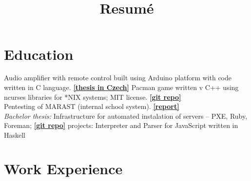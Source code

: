 \documentclass[11pt,a4paper]{moderncv}        %
\title{Resumé}                               %
\begin{document}
  \makecvtitle

  \section{Education}
          {Audio amplifier with remote control built using Arduino platform with code written in C language. \href{https://bitbucket.org/j-sokol/amplifier-thesis/raw/cc8bd90b60f1a370cd586138043608f768a8d719/Dokumentace1.pdf}{\textbf{[thesis in Czech]}} }  %
          {Pacman game written v C++ using ncurses libraries for *NIX systems; MIT license. \href{https://github.com/j-sokol/ncursesPac}{\textbf{[git repo]}} \\
          Pentesting of MARAST (internal school system). \href{https://bitbucket.org/j-sokol/marast-pentest-report/raw/376bb2e8dc154c45286e8a6963c00aa809b3931a/Penetration-Test-Report-on-Marast-Application.pdf}{\textbf{[report]}} \\
          \textit{Bachelor thesis:} Infrastructure for automated instalation of servers -- PXE, Ruby, Foreman; \href{https://github.com/j-sokol/bachelor-thesis}{\textbf{[git repo]}} }
          {projects: Interpreter and Parser for JavaScript written in Haskell}


  \section{Work Experience}
\end{document}
